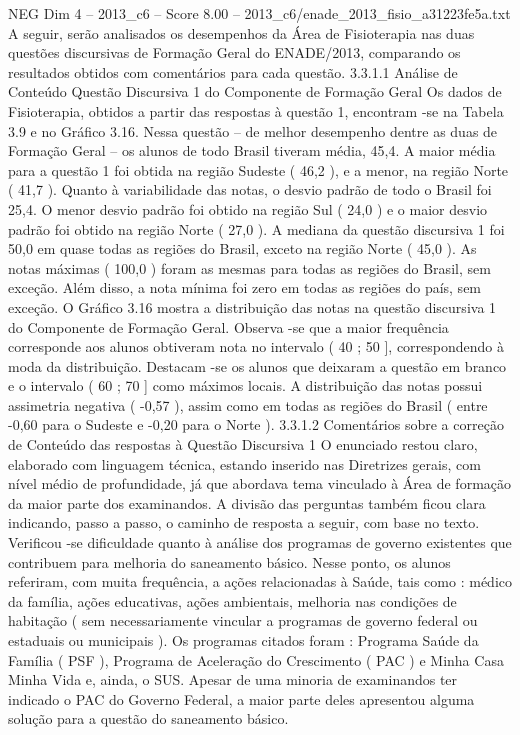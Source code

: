 \begin{textsample}{NEG Dim 4 – 2013\_c6 – Score 8.00 – 2013\_c6/enade\_2013\_fisio\_a31223fe5a.txt}
A seguir, serão analisados os desempenhos da Área de Fisioterapia nas duas questões discursivas de Formação Geral do ENADE/2013, comparando os resultados obtidos com comentários para cada questão. 3.3.1.1 Análise de Conteúdo Questão Discursiva 1 do Componente de Formação Geral Os dados de Fisioterapia, obtidos a partir das respostas à questão 1, encontram -se na Tabela 3.9 e no Gráfico 3.16.
Nessa questão – de melhor desempenho dentre as duas de Formação Geral – os alunos de todo Brasil tiveram média, 45,4.
A maior média para a questão 1 foi obtida na região Sudeste ( 46,2 ), e a menor, na região Norte ( 41,7 ).
Quanto à variabilidade das notas, o desvio padrão de todo o Brasil foi 25,4.
O menor desvio padrão foi obtido na região Sul ( 24,0 ) e o maior desvio padrão foi obtido na região Norte ( 27,0 ).
A mediana da questão discursiva 1 foi 50,0 em quase todas as regiões do Brasil, exceto na região Norte ( 45,0 ).
As notas máximas ( 100,0 ) foram as mesmas para todas as regiões do Brasil, sem exceção.
Além disso, a nota mínima foi zero em todas as regiões do país, sem exceção.
O Gráfico 3.16 mostra a distribuição das notas na questão discursiva 1 do Componente de Formação Geral.
Observa -se que a maior frequência corresponde aos alunos obtiveram nota no intervalo ( 40 ; 50 ], correspondendo à moda da distribuição.
Destacam -se os alunos que deixaram a questão em branco e o intervalo ( 60 ; 70 ] como máximos locais.
A distribuição das notas possui assimetria negativa ( -0,57 ), assim como em todas as regiões do Brasil ( entre -0,60 para o Sudeste e -0,20 para o Norte ). 3.3.1.2 Comentários sobre a correção de Conteúdo das respostas à Questão Discursiva 1 O enunciado restou claro, elaborado com linguagem técnica, estando inserido nas Diretrizes gerais, com nível médio de profundidade, já que abordava tema vinculado à Área de formação da maior parte dos examinandos.
A divisão das perguntas também ficou clara indicando, passo a passo, o caminho de resposta a seguir, com base no texto.
Verificou -se dificuldade quanto à análise dos programas de governo existentes que contribuem para melhoria do saneamento básico.
Nesse ponto, os alunos referiram, com muita frequência, a ações relacionadas à Saúde, tais como : médico da família, ações educativas, ações ambientais, melhoria nas condições de habitação ( sem necessariamente vincular a programas de governo federal ou estaduais ou municipais ).
Os programas citados foram : Programa Saúde da Família ( PSF ), Programa de Aceleração do Crescimento ( PAC ) e Minha Casa Minha Vida e, ainda, o SUS.
Apesar de uma minoria de examinandos ter indicado o PAC do Governo Federal, a maior parte deles apresentou alguma solução para a questão do saneamento básico.

\end{textsample}

